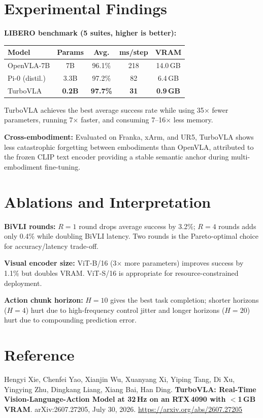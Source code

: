 \documentclass[10pt,twocolumn]{article}
\begin{document}
\section{Experimental Findings}

\textbf{LIBERO benchmark (5 suites, higher is better):}

\begin{center}\small
\begin{tabular}{lcccc}
\toprule
Model & Params & Avg. & ms/step & VRAM \\
\midrule
OpenVLA-7B & 7B & 96.1\% & 218 & 14.0\,GB \\
Pi-0 (distil.) & 3.3B & 97.2\% & 82 & 6.4\,GB \\
TurboVLA & \textbf{0.2B} & \textbf{97.7\%} & \textbf{31} & \textbf{0.9\,GB} \\
\bottomrule
\end{tabular}
\end{center}

TurboVLA achieves the best average success rate while using 35$\times$
fewer parameters, running 7$\times$ faster, and consuming 7--16$\times$
less memory.

\textbf{Cross-embodiment:} Evaluated on Franka, xArm, and UR5, TurboVLA
shows less catastrophic forgetting between embodiments than OpenVLA,
attributed to the frozen CLIP text encoder providing a stable semantic
anchor during multi-embodiment fine-tuning.

\section{Ablations and Interpretation}

\textbf{BiVLI rounds:} $R=1$ round drops average success by 3.2\%; $R=4$
rounds adds only 0.4\% while doubling BiVLI latency. Two rounds is the
Pareto-optimal choice for accuracy/latency trade-off.

\textbf{Visual encoder size:} ViT-B/16 (3$\times$ more parameters) improves
success by 1.1\% but doubles VRAM. ViT-S/16 is appropriate for
resource-constrained deployment.

\textbf{Action chunk horizon:} $H=10$ gives the best task completion;
shorter horizons ($H=4$) hurt due to high-frequency control jitter and
longer horizons ($H=20$) hurt due to compounding prediction error.

\section*{Reference}

Hengyi Xie, Chenfei Yao, Xianjin Wu, Xuanyang Xi, Yiping Tang, Di Xu,
Yingying Zhu, Dingkang Liang, Xiang Bai, Han Ding.
\textbf{TurboVLA: Real-Time Vision-Language-Action Model at 32\,Hz on
an RTX\,4090 with $<$1\,GB VRAM}.
arXiv:2607.27205, July 30, 2026.
\url{https://arxiv.org/abs/2607.27205}
\end{document}
